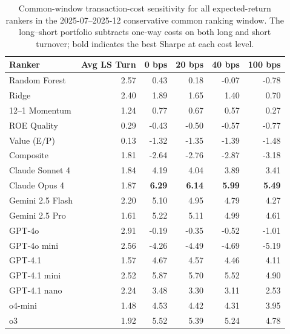 \begin{table}[H]
\centering
\caption{Common-window transaction-cost sensitivity for all expected-return rankers in the 2025-07--2025-12 conservative common ranking window. The long--short portfolio subtracts one-way costs on both long and short turnover; bold indicates the best Sharpe at each cost level.}
\label{tab:cost-sensitivity}
\scriptsize
\begin{tabular}{lrrrrr}
\toprule
\textbf{Ranker} & \textbf{Avg LS Turn} & \textbf{0 bps} & \textbf{20 bps} & \textbf{40 bps} & \textbf{100 bps} \\
\midrule
Random Forest & 2.57 & 0.43 & 0.18 & -0.07 & -0.78 \\
Ridge & 2.40 & 1.89 & 1.65 & 1.40 & 0.70 \\
12--1 Momentum & 1.24 & 0.77 & 0.67 & 0.57 & 0.27 \\
ROE Quality & 0.29 & -0.43 & -0.50 & -0.57 & -0.77 \\
Value (E/P) & 0.13 & -1.32 & -1.35 & -1.39 & -1.48 \\
Composite & 1.81 & -2.64 & -2.76 & -2.87 & -3.18 \\
Claude Sonnet 4 & 1.84 & 4.19 & 4.04 & 3.89 & 3.41 \\
Claude Opus 4 & 1.87 & \textbf{6.29} & \textbf{6.14} & \textbf{5.99} & \textbf{5.49} \\
Gemini 2.5 Flash & 2.20 & 5.10 & 4.95 & 4.79 & 4.27 \\
Gemini 2.5 Pro & 1.61 & 5.22 & 5.11 & 4.99 & 4.61 \\
GPT-4o & 2.91 & -0.19 & -0.35 & -0.52 & -1.01 \\
GPT-4o mini & 2.56 & -4.26 & -4.49 & -4.69 & -5.19 \\
GPT-4.1 & 1.57 & 4.67 & 4.57 & 4.46 & 4.11 \\
GPT-4.1 mini & 2.52 & 5.87 & 5.70 & 5.52 & 4.90 \\
GPT-4.1 nano & 2.24 & 3.48 & 3.30 & 3.11 & 2.53 \\
o4-mini & 1.48 & 4.53 & 4.42 & 4.31 & 3.95 \\
o3 & 1.92 & 5.52 & 5.39 & 5.24 & 4.78 \\
\bottomrule
\end{tabular}
\end{table}
